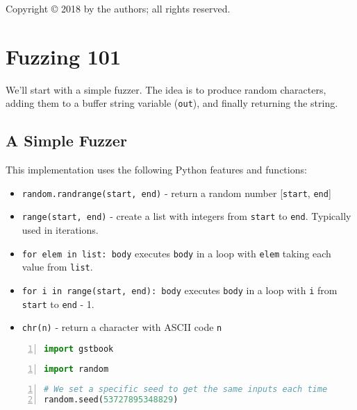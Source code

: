 \documentclass[10pt,parskip=half,
	toc=sectionentrywithdots,
	bibliography=totocnumbered,
	captions=tableheading,numbers=noendperiod]{scrartcl}
\providecommand{\tightlist}{%
  \setlength{\itemsep}{0pt}\setlength{\parskip}{0pt}}
\begin{document}
Copyright © 2018 by the authors; all rights reserved.

\section{Fuzzing 101}\label{fuzzing-101}

We'll start with a simple fuzzer. The idea is to produce random
characters, adding them to a buffer string variable (\texttt{out}), and
finally returning the string.

\subsection{A Simple Fuzzer}\label{a-simple-fuzzer}

This implementation uses the following Python features and functions:

\begin{itemize}
\tightlist
\item
  \texttt{random.randrange(start,\ end)} - return a random number
  {[}\texttt{start}, \texttt{end}{]}
\item
  \texttt{range(start,\ end)} - create a list with integers from
  \texttt{start} to \texttt{end}. Typically used in iterations.
\item
  \texttt{for\ elem\ in\ list:\ body} executes \texttt{body} in a loop
  with \texttt{elem} taking each value from \texttt{list}.
\item
  \texttt{for\ i\ in\ range(start,\ end):\ body} executes \texttt{body}
  in a loop with \texttt{i} from \texttt{start} to \texttt{end} - 1.
\item
  \texttt{chr(n)} - return a character with ASCII code \texttt{n}
\end{itemize}

\begin{lstlisting}[language=Python,numbers=left,xleftmargin=20pt,xrightmargin=5pt,belowskip=5pt,aboveskip=5pt]
import gstbook
\end{lstlisting}

\begin{lstlisting}[language=Python,numbers=left,xleftmargin=20pt,xrightmargin=5pt,belowskip=5pt,aboveskip=5pt]
import random
\end{lstlisting}

\begin{lstlisting}[language=Python,numbers=left,xleftmargin=20pt,xrightmargin=5pt,belowskip=5pt,aboveskip=5pt]
# We set a specific seed to get the same inputs each time
random.seed(53727895348829)
\end{lstlisting}
\end{document}
